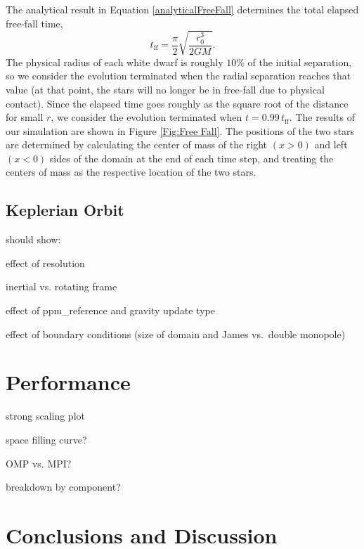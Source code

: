 \documentclass[12pt,preprint]{aastex}
\begin{document}
The analytical result in Equation \ref{analyticalFreeFall} determines
the total elapsed free-fall time,
\[
  t_{\text{ff}} = \frac{\pi}{2} \sqrt{\frac{r_0^3}{2GM}}.
\]
The physical radius of each white dwarf is roughly $10\%$ of the
initial separation, so we consider the evolution terminated when the
radial separation reaches that value (at that point, the stars will no
longer be in free-fall due to physical contact). Since the elapsed
time goes roughly as the square root of the distance for small $r$, we
consider the evolution terminated when $t = 0.99\, t_{\text{ff}}$. The
results of our simulation are shown in Figure \ref{Fig:Free Fall}. The
positions of the two stars are determined by calculating the center of
mass of the right $(x > 0)$ and left $(x < 0)$ sides of the domain at 
the end of each time step, and treating the centers of mass as the 
respective location of the two stars.


\subsection{Keplerian Orbit}\label{Sec:Kepler}

should show:

effect of resolution

inertial vs. rotating frame

effect of ppm\_reference and gravity update type

effect of boundary conditions (size of domain and James vs.\ double monopole)


\section{Performance}\label{Sec:Performance}

strong scaling plot

space filling curve?

OMP vs. MPI?

breakdown by component?


\section{Conclusions and Discussion}\label{Sec:Conclusions and Discussion}
\end{document}
